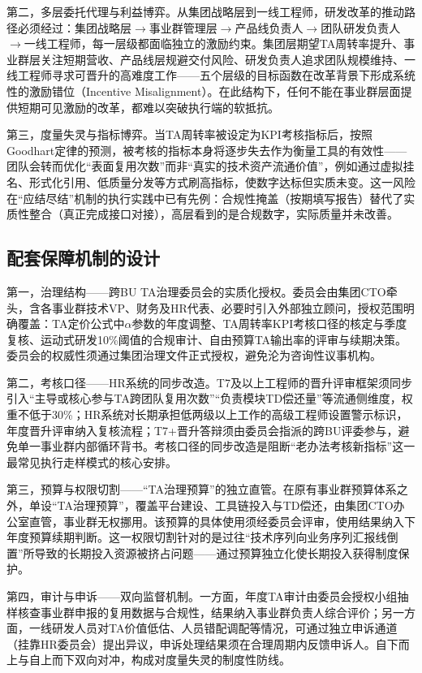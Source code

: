 第二，多层委托代理与利益博弈。从集团战略层到一线工程师，研发改革的推动路径必须经过：集团战略层$\to$事业群管理层$\to$产品线负责人$\to$团队研发负责人$\to$一线工程师，每一层级都面临独立的激励约束。集团层期望TA周转率提升、事业群层关注短期营收、产品线层规避交付风险、研发负责人追求团队规模维持、一线工程师寻求可晋升的高难度工作——五个层级的目标函数在改革背景下形成系统性的激励错位（Incentive Misalignment）。在此结构下，任何不能在事业群层面提供短期可见激励的改革，都难以突破执行端的软抵抗。

第三，度量失灵与指标博弈。当TA周转率被设定为KPI考核指标后，按照Goodhart定律\cite{muller2018goodhart}的预测，被考核的指标本身将逐步失去作为衡量工具的有效性——团队会转而优化“表面复用次数”而非“真实的技术资产流通价值”，例如通过虚拟挂名、形式化引用、低质量分发等方式刷高指标，使数字达标但实质未变。这一风险在“应结尽结”机制的执行实践中已有先例：合规性掩盖（按期填写报告）替代了实质性整合（真正完成接口对接），高层看到的是合规数字，实际质量并未改善。

\subsection{配套保障机制的设计}
\label{subsec:execution-safeguards-design}

第一，治理结构——跨BU TA治理委员会的实质化授权。委员会由集团CTO牵头，含各事业群技术VP、财务及HR代表、必要时引入外部独立顾问，授权范围明确覆盖：TA定价公式中$\alpha$参数的年度调整、TA周转率KPI考核口径的核定与季度复核、运动式研发10\%阈值的合规审计、自由预算TA输出率的评审与续期决策。委员会的权威性须通过集团治理文件正式授权，避免沦为咨询性议事机构。

第二，考核口径——HR系统的同步改造。T7及以上工程师的晋升评审框架须同步引入“主导或核心参与TA跨团队复用次数”“负责模块TD偿还量”等流通侧维度，权重不低于30\%；HR系统对长期承担低两级以上工作的高级工程师设置警示标识，年度晋升评审纳入复核流程；T7+晋升答辩须由委员会指派的跨BU评委参与，避免单一事业群内部循环背书。考核口径的同步改造是阻断“老办法考核新指标”这一最常见执行走样模式的核心安排。

第三，预算与权限切割——“TA治理预算”的独立直管。在原有事业群预算体系之外，单设“TA治理预算”，覆盖平台建设、工具链投入与TD偿还，由集团CTO办公室直管，事业群无权挪用。该预算的具体使用须经委员会评审，使用结果纳入下年度预算续期判断。这一权限切割针对的是过往“技术序列向业务序列汇报线倒置”所导致的长期投入资源被挤占问题——通过预算独立化使长期投入获得制度保护。

第四，审计与申诉——双向监督机制。一方面，年度TA审计由委员会授权小组抽样核查事业群申报的复用数据与合规性，结果纳入事业群负责人综合评价；另一方面，一线研发人员对TA价值低估、人员错配调配等情况，可通过独立申诉通道（挂靠HR委员会）提出异议，申诉处理结果须在合理周期内反馈申诉人。自下而上与自上而下双向对冲，构成对度量失灵的制度性防线。

